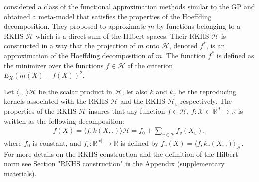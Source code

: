 \citet{DURRANDE201357} considered a class of the functional approximation methods similar to the GP and obtained a meta-model that satisfies the properties of the Hoeffding decomposition. 
They proposed to approximate $m$ by functions belonging to a RKHS $\mathcal{H}$ which is a direct sum of the Hilbert spaces. Their RKHS $\mathcal{H}$ is constructed in a way that the projection of $m$ onto $\mathcal{H}$, denoted $f^*$, is an approximation of the Hoeffding decomposition of $m$.  
The function $f^*$ is defined as the minimizer over the functions $f\in\mathcal{H}$ of the criterion $E_X(m(X)-f(X))^2.$

Let $\langle.,.\rangle\mathcal{H}$ be the scalar product in $\mathcal{H}$, let also $k$ and $k_v$ be the reproducing kernels associated with the RKHS $\mathcal{H}$ and the RKHS $\mathcal{H}_v$ respectively. The properties of the RKHS $\mathcal{H}$ insures that any function $f\in\mathcal{H}$, $f:\mathcal{X}\subset \mathbb{R}^d\rightarrow\mathbb{R}$ is written as the following decomposition: 
\begin{align}
\label{durandhoeff}
f(X)=\langle f,k(X,.)\rangle{\mathcal{H}}=f_0+\sum_{v\in\mathcal{P}}f_v(X_v),
\end{align}
where $f_0$ is constant, and $f_v:\mathbb{R}^{\vert v\vert}\rightarrow \mathbb{R}$ is defined by $f_v(X)=\langle f,k_v(X,.)\rangle_{\mathcal{H}}$. For more details on the RKHS construction and the definition of the Hilbert norm see Section "RKHS construction" in the Appendix (supplementary materials). 

